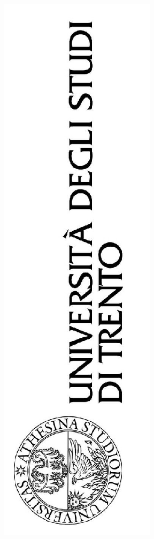 \documentclass[12pt, a4paper, openany]{article}
\begin{document}
  \begin{titlepage}
    \centering

     \begin{figure}[ht]
       \centering
       \includegraphics[angle=-90, keepaspectratio=true, width=8cm]{logo.png}
     \end{figure}


\end{titlepage}
\end{document}

